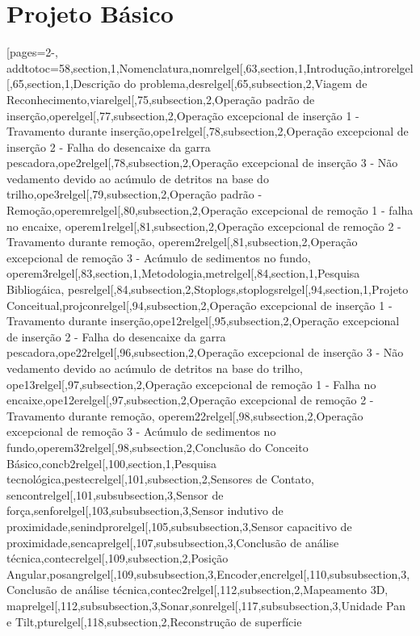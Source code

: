 \documentclass[a4paper,11pt,oneside,brazilian,
draft=false]{report}%
\begin{document}
\chapter{Projeto Básico}
[pages=2-,
addtotoc={58,section,1,Nomenclatura,nomrelgel[,63,section,1,Introdução,introrelgel[,65,section,1,Descrição
do problema,desrelgel[,65,subsection,2,Viagem de 
Reconhecimento,viarelgel[,75,subsection,2,Operação padrão de
inserção,operelgel[,77,subsection,2,Operação excepcional de inserção 1 -
Travamento durante inserção,ope1relgel[,78,subsection,2,Operação excepcional de
inserção 2 - Falha do desencaixe da garra
pescadora,ope2relgel[,78,subsection,2,Operação excepcional de inserção 3 - Não
vedamento devido ao acúmulo de detritos na base do
trilho,ope3relgel[,79,subsection,2,Operação padrão -
Remoção,operemrelgel[,80,subsection,2,Operação excepcional de remoção 1 - falha
no encaixe, operem1relgel[,81,subsection,2,Operação excepcional de remoção 2 -
Travamento durante remoção, operem2relgel[,81,subsection,2,Operação excepcional
de remoção 3 - Acúmulo de sedimentos no fundo,
operem3relgel[,83,section,1,Metodologia,metrelgel[,84,section,1,Pesquisa
Bibliogáica,
pesrelgel[,84,subsection,2,Stoplogs,stoplogsrelgel[,94,section,1,Projeto
Conceitual,projconrelgel[,94,subsection,2,Operação excepcional de inserção 1 -
Travamento durante inserção,ope12relgel[,95,subsection,2,Operação excepcional de
inserção 2 - Falha do desencaixe da garra
pescadora,ope22relgel[,96,subsection,2,Operação excepcional de inserção 3 - Não
vedamento devido ao acúmulo de detritos na base do trilho, 
ope13relgel[,97,subsection,2,Operação excepcional de remoção 1 - Falha no
encaixe,ope12erelgel[,97,subsection,2,Operação excepcional de remoção 2 -
Travamento durante remoção, operem22relgel[,98,subsection,2,Operação excepcional
de remoção 3 - Acúmulo de sedimentos no
fundo,operem32relgel[,98,subsection,2,Conclusão do Conceito
Básico,concb2relgel[,100,section,1,Pesquisa
tecnológica,pestecrelgel[,101,subsection,2,Sensores de Contato,
sencontrelgel[,101,subsubsection,3,Sensor de
força,senforelgel[,103,subsubsection,3,Sensor indutivo de
proximidade,senindprorelgel[,105,subsubsection,3,Sensor capacitivo de
proximidade,sencaprelgel[,107,subsubsection,3,Conclusão de análise
técnica,contecrelgel[,109,subsection,2,Posição
Angular,posangrelgel[,109,subsubsection,3,Encoder,encrelgel[,110,subsubsection,3,Conclusão
de análise técnica,contec2relgel[,112,subsection,2,Mapeamento 3D,
maprelgel[,112,subsubsection,3,Sonar,sonrelgel[,117,subsubsection,3,Unidade
Pan e Tilt,pturelgel[,118,subsection,2,Reconstrução de superfície
}
\end{document}

